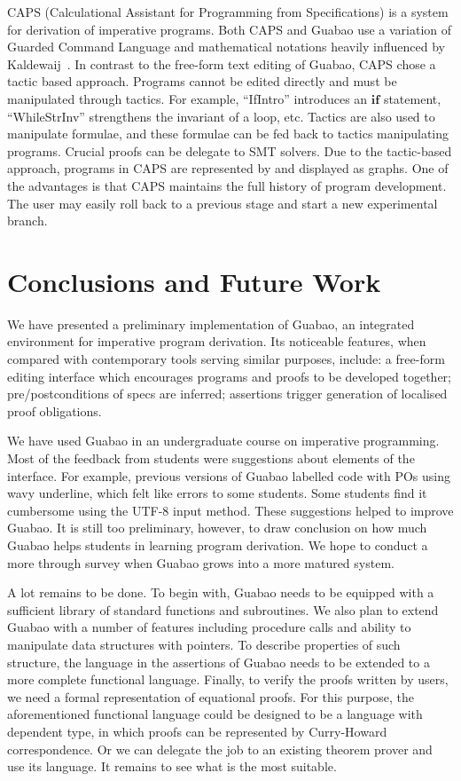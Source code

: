 \documentclass[runningheads]{llncs}
\begin{document}
CAPS (Calculational Assistant for Programming from Specifications) \cite{Chaudhari:14:Automated,Chaudhari:15:Building} is a system for derivation of imperative programs.
Both CAPS and Guabao use a variation of Guarded Command Language and mathematical notations heavily influenced by Kaldewaij~\cite{Kaldewaij:90:Programming}.
In contrast to the free-form text editing of Guabao, CAPS chose a tactic based approach.
Programs cannot be edited directly and must be manipulated through tactics.
For example, ``IfIntro'' introduces an \ensuremath{\mathbf{if}} statement,
``WhileStrInv'' strengthens the invariant of a loop, etc.
Tactics are also used to manipulate formulae, and these formulae can be fed back to tactics manipulating programs.
Crucial proofs can be delegate to SMT solvers.
Due to the tactic-based approach, programs in CAPS are represented by and displayed as graphs.
One of the advantages is that CAPS maintains the full history of program development.
The user may easily roll back to a previous stage and start a new experimental branch.

\section{Conclusions and Future Work}
\label{sec:conclude}

We have presented a preliminary implementation of Guabao, an integrated environment for imperative program derivation.
Its noticeable features, when compared with contemporary tools serving similar purposes, include: a free-form editing interface which encourages programs and proofs to be developed together; pre/postconditions of specs are inferred; assertions trigger generation of localised proof obligations.

We have used Guabao in an undergraduate course on imperative programming.
Most of the feedback from students were suggestions about elements of the interface.
For example, previous versions of Guabao labelled code with POs using wavy underline, which felt like errors to some students.
Some students find it cumbersome using the UTF-8 input method.
These suggestions helped to improve Guabao.
It is still too preliminary, however, to draw conclusion on how much Guabao helps students in learning program derivation.
We hope to conduct a more through survey when Guabao grows into a more matured system.

A lot remains to be done.
To begin with, Guabao needs to be equipped with a sufficient library of standard functions and subroutines.
We also plan to extend Guabao with a number of features including procedure calls and ability to manipulate data structures with pointers.
To describe properties of such structure, the language in the assertions of Guabao needs to be extended to a more complete functional language.
Finally, to verify the proofs written by users, we need a formal representation of equational proofs.
For this purpose, the aforementioned functional language could be designed to be a language with dependent type, in which proofs can be represented by Curry-Howard correspondence.
Or we can delegate the job to an existing theorem prover and use its language.
It remains to see what is the most suitable.
\end{document}
